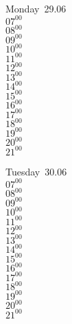\documentclass[11pt,a4paper]{book}\usepackage[]{graphicx}\usepackage[]{color}
\begin{document}
\vspace{2 mm}\\
\begin{tcolorbox}
Monday~29.06\\
{ 
  $07^{00}$\\
$08^{00}$\\
$09^{00}$\\
$10^{00}$\\
$11^{00}$\\
$12^{00}$\\
$13^{00}$\\
$14^{00}$\\
$15^{00}$\\
$16^{00}$\\
$17^{00}$\\
$18^{00}$\\
$19^{00}$\\
$20^{00}$\\
$21^{00}$}\\

\end{tcolorbox}
\begin{tcolorbox}
Tuesday~30.06\\
{ 
  $07^{00}$\\
$08^{00}$\\
$09^{00}$\\
$10^{00}$\\
$11^{00}$\\
$12^{00}$\\
$13^{00}$\\
$14^{00}$\\
$15^{00}$\\
$16^{00}$\\
$17^{00}$\\
$18^{00}$\\
$19^{00}$\\
$20^{00}$\\
$21^{00}$}\\

\end{tcolorbox}
\end{document}
